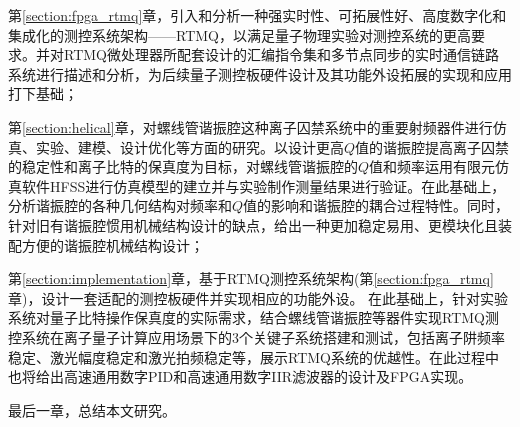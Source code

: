 第\ref{section:fpga_rtmq}章，引入和分析一种强实时性、可拓展性好、高度数字化和集成化的测控系统架构——RTMQ，以满足量子物理实验对测控系统的更高要求。并对RTMQ微处理器所配套设计的汇编指令集和多节点同步的实时通信链路系统进行描述和分析，为后续量子测控板硬件设计及其功能外设拓展的实现和应用打下基础；

第\ref{section:helical}章，对螺线管谐振腔这种离子囚禁系统中的重要射频器件进行仿真、实验、建模、设计优化等方面的研究。以设计更高$Q$值的谐振腔提高离子囚禁的稳定性和离子比特的保真度为目标，对螺线管谐振腔的$Q$值和频率运用有限元仿真软件HFSS进行仿真模型的建立并与实验制作测量结果进行验证。在此基础上，分析谐振腔的各种几何结构对频率和$Q$值的影响和谐振腔的耦合过程特性。同时，针对旧有谐振腔惯用机械结构设计的缺点，给出一种更加稳定易用、更模块化且装配方便的谐振腔机械结构设计；

第\ref{section:implementation}章，基于RTMQ测控系统架构(第\ref{section:fpga_rtmq}章)，设计一套适配的测控板硬件并实现相应的功能外设。
在此基础上，针对实验系统对量子比特操作保真度的实际需求，结合螺线管谐振腔等器件实现RTMQ测控系统在离子量子计算应用场景下的3个关键子系统搭建和测试，包括离子阱频率稳定、激光幅度稳定和激光拍频稳定等，展示RTMQ系统的优越性。在此过程中也将给出高速通用数字PID和高速通用数字IIR滤波器的设计及FPGA实现。

最后一章，总结本文研究。

